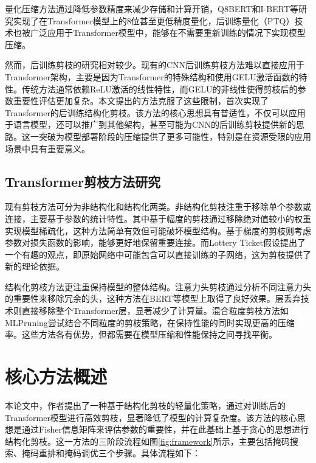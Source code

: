 \documentclass[UTF8,openany]{ctexbook}
\begin{document}
量化压缩方法通过降低参数精度来减少存储和计算开销，Q8BERT\cite{zafrir2019q8bert}和I-BERT\cite{kim2021ibert}等研究实现了在Transformer模型上的8位甚至更低精度量化，后训练量化（PTQ）技术\cite{nagel2020up}也被广泛应用于Transformer模型中，能够在不需要重新训练的情况下实现模型压缩。

然而，后训练剪枝的研究相对较少。现有的CNN后训练剪枝方法\cite{yvinec2021red}难以直接应用于Transformer架构，主要是因为Transformer的特殊结构和使用GELU激活函数\cite{hendrycks2016gaussian}的特性。传统方法通常依赖ReLU激活的线性特性\cite{kim2020neuron}，而GELU的非线性使得剪枝后的参数重要性评估更加复杂。本文提出的方法克服了这些限制，首次实现了Transformer的后训练结构化剪枝。该方法的核心思想具有普适性，不仅可以应用于语言模型，还可以推广到其他架构，甚至可能为CNN的后训练剪枝提供新的思路。这一突破为模型部署阶段的压缩提供了更多可能性，特别是在资源受限的应用场景中具有重要意义。

\subsection{Transformer剪枝方法研究}
\label{sec:transformer_pruning_methods}

现有剪枝方法可分为非结构化和结构化两类。非结构化剪枝注重于移除单个参数或连接，主要基于参数的统计特性。其中基于幅度的剪枝\cite{gale2019state}通过移除绝对值较小的权重实现模型稀疏化，这种方法简单有效但可能破坏模型结构。基于梯度的剪枝\cite{molchanov2019importance}则考虑参数对损失函数的影响，能够更好地保留重要连接。而Lottery Ticket假设\cite{frankle2018lottery}提出了一个有趣的观点，即原始网络中可能包含可以直接训练的子网络，这为剪枝提供了新的理论依据。

结构化剪枝方法更注重保持模型的整体结构。注意力头剪枝\cite{michel2019heads}通过分析不同注意力头的重要性来移除冗余的头，这种方法在BERT等模型上取得了良好效果。层丢弃技术\cite{fan2019reducing}则直接移除整个Transformer层，显著减少了计算量。混合粒度剪枝方法如MLPruning\cite{yao2021mlpruning}尝试结合不同粒度的剪枝策略，在保持性能的同时实现更高的压缩率。这些方法各有优势，但都需要在模型压缩和性能保持之间寻找平衡。

\section{核心方法概述}

本论文中，作者提出了一种基于结构化剪枝的轻量化策略，通过对训练后的Transformer模型进行高效剪枝，显著降低了模型的计算复杂度。该方法的核心思想是通过Fisher信息矩阵来评估参数的重要性，并在此基础上基于贪心的思想进行结构化剪枝。这一方法的三阶段流程如图\ref{fig:framework}所示，主要包括掩码搜索、掩码重排和掩码调优三个步骤。具体流程如下：
\end{document}
